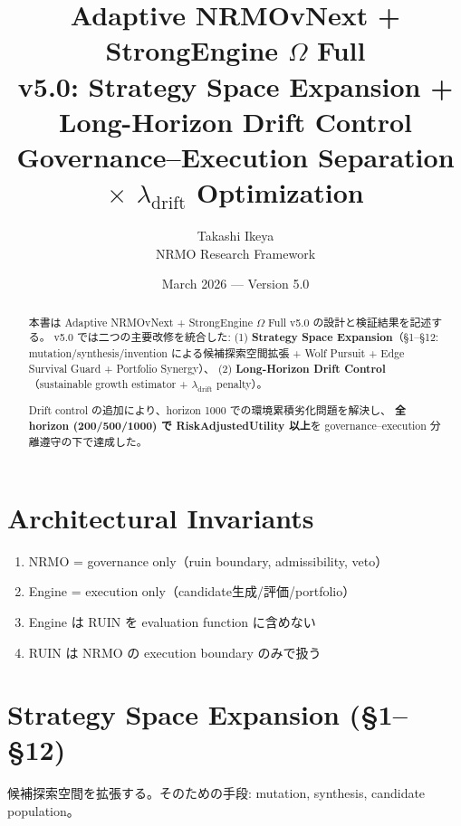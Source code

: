 \documentclass[11pt,a4paper]{article}
\title{\vspace{-1cm}
  {\LARGE\sffamily\bfseries\color{nb}Adaptive NRMOvNext + StrongEngine $\Omega$ Full}\\[6pt]
  {\Large\sffamily\color{nb!70}v5.0: Strategy Space Expansion + Long-Horizon Drift Control}\\[6pt]
  {\large\sffamily\color{ngr}Governance--Execution Separation $\times$ $\lambda_\text{drift}$ Optimization}}
\author{\sffamily Takashi Ikeya\\\small\sffamily\color{ngr}NRMO Research Framework}
\date{\sffamily March 2026 — Version 5.0}
\begin{document}
\maketitle\thispagestyle{fancy}

\begin{abstract}\noindent
本書は Adaptive NRMOvNext + StrongEngine $\Omega$ Full v5.0 の設計と検証結果を記述する。
v5.0 では二つの主要改修を統合した:
(1) \textbf{Strategy Space Expansion}（\S1--\S12: mutation/synthesis/invention による候補探索空間拡張 + Wolf Pursuit + Edge Survival Guard + Portfolio Synergy）、
(2) \textbf{Long-Horizon Drift Control}（sustainable growth estimator + $\lambda_\text{drift}$ penalty）。

Drift control の追加により、horizon 1000 での環境累積劣化問題を解決し、
\textbf{全 horizon (200/500/1000) で RiskAdjustedUtility 以上}を governance--execution 分離遵守の下で達成した。
\end{abstract}

\tableofcontents\newpage

\section{Architectural Invariants}

\begin{warning}[不変条件]
\begin{enumerate}[leftmargin=1.5em]
  \item NRMO = governance only（ruin boundary, admissibility, veto）
  \item Engine = execution only（candidate生成/評価/portfolio）
  \item Engine は RUIN を evaluation function に含めない
  \item RUIN は NRMO の execution boundary のみで扱う
\end{enumerate}
\end{warning}

\section{Strategy Space Expansion (\S1--\S12)}

\begin{omegabox}[$\Omega$ Full = Strategy Space Expansion Engine]
候補探索空間を拡張する。そのための手段: mutation, synthesis, candidate population。
\end{omegabox}
\end{document}
